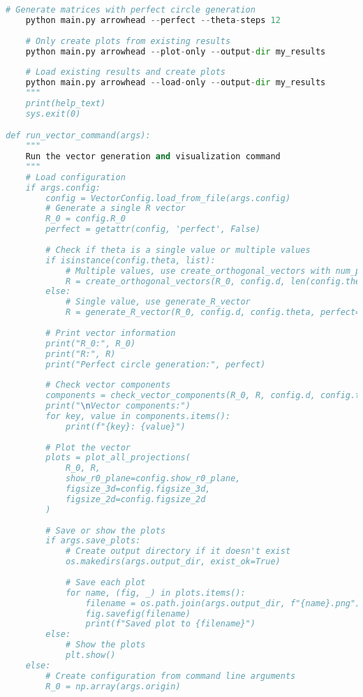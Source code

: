 \begin{lstlisting}[language=Python]
    # Generate matrices with perfect circle generation
    python main.py arrowhead --perfect --theta-steps 12
    
    # Only create plots from existing results
    python main.py arrowhead --plot-only --output-dir my_results
    
    # Load existing results and create plots
    python main.py arrowhead --load-only --output-dir my_results
    """
    print(help_text)
    sys.exit(0)

def run_vector_command(args):
    """
    Run the vector generation and visualization command
    """
    # Load configuration
    if args.config:
        config = VectorConfig.load_from_file(args.config)
        # Generate a single R vector
        R_0 = config.R_0
        perfect = getattr(config, 'perfect', False)
        
        # Check if theta is a single value or multiple values
        if isinstance(config.theta, list):
            # Multiple values, use create_orthogonal_vectors with num_points
            R = create_orthogonal_vectors(R_0, config.d, len(config.theta), perfect=perfect)
        else:
            # Single value, use generate_R_vector
            R = generate_R_vector(R_0, config.d, config.theta, perfect=perfect)
        
        # Print vector information
        print("R_0:", R_0)
        print("R:", R)
        print("Perfect circle generation:", perfect)
        
        # Check vector components
        components = check_vector_components(R_0, R, config.d, config.theta, perfect=perfect)
        print("\nVector components:")
        for key, value in components.items():
            print(f"{key}: {value}")
        
        # Plot the vector
        plots = plot_all_projections(
            R_0, R,
            show_r0_plane=config.show_r0_plane,
            figsize_3d=config.figsize_3d,
            figsize_2d=config.figsize_2d
        )
        
        # Save or show the plots
        if args.save_plots:
            # Create output directory if it doesn't exist
            os.makedirs(args.output_dir, exist_ok=True)
            
            # Save each plot
            for name, (fig, _) in plots.items():
                filename = os.path.join(args.output_dir, f"{name}.png")
                fig.savefig(filename)
                print(f"Saved plot to {filename}")
        else:
            # Show the plots
            plt.show()
    else:
        # Create configuration from command line arguments
        R_0 = np.array(args.origin)
        

\end{lstlisting}
